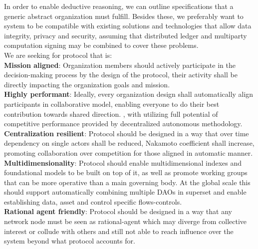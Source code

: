 \documentclass{article}
\begin{document}
\begin{CJK}{UTF8}{gbsn}
\begin{multicols}{2}
In order to enable deductive reasoning, we can outline specifications that a generic abstract organization must fulfill. Besides these, we preferably want to system to be compatible with existing solutions and technologies that allow data integrity, privacy and security, assuming that distributed ledger and multiparty computation signing may be combined to cover these problems. \\
We are seeking for protocol that is:\\
\textbf{Mission aligned}: Organization members should actively participate in the decision-making process by the design of the protocol, their activity shall be directly impacting the organization goals and mission.\\
\textbf{Highly performant}: Ideally, every organization design shall automatically align participants in collaborative model, enabling everyone to do their best contribution towards shared direction. , with utilizing full potential of competitive performance provided by decentralized autonomous methodology.\\
\textbf{Centralization resilient}: Protocol should be designed in a way that over time dependency on single actors shall be reduced, Nakamoto coefficient shall increase, promoting collaboration over competition for those aligned in automatic manner. \\
\textbf{Multidimensionality}: Protocol should enable multidimensional indexes and foundational models to be built on top of it, as well as promote working groups that can be more operative than a main governing body. At the global scale this should support automatically combining multiple DAOs in superset and enable establishing data, asset and control specific flows-controls.\\
\textbf{Rational agent friendly}: Protocol should be designed in a way that any network node must be seen as rational-agent which may diverge from collective interest or collude with others and still not able to reach  influence over the system beyond what protocol accounts for.


\end{multicols}
\end{CJK}
\end{document}
